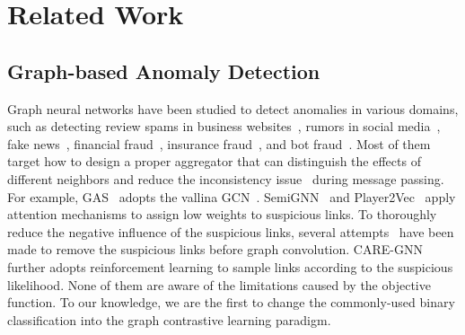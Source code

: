 \section{Related Work}
\label{sec:related}

\subsection{Graph-based Anomaly Detection}
Graph neural networks have been studied to detect anomalies in various domains, such as detecting review spams in business websites~\cite{dou2020enhancing,li2019spam,liu2020alleviating, liu2021pick}, 
rumors in social media~\cite{bian2020rumor,wu2020graph,yang2020rumor}, fake news~\cite{AA-HGNN2020,FangModel}, financial fraud~\cite{liu2019geniepath,xu2021towards,rao2021xfraud}, insurance fraud~\cite{liang2019uncovering}, and bot fraud~\cite{yao2020botspot}.
Most of them target how to design a proper aggregator that can distinguish the effects of different neighbors and reduce the inconsistency issue~\cite{liu2020alleviating} during message passing. For example, GAS~\cite{li2019spam} adopts the vallina GCN~\cite{kipf2016semi}. SemiGNN~\cite{SemiGNN} and Player2Vec~\cite{zhang2019key} apply attention mechanisms to assign low weights to suspicious links. To thoroughly reduce the negative influence of the suspicious links, several attempts~\cite{franceschi2019learning, liu2020alleviating} have been made to remove the suspicious links before graph convolution. CARE-GNN~\cite{dou2020enhancing} further adopts reinforcement learning to sample links according to the suspicious likelihood.
None of them are aware of the limitations caused by the objective function. To our knowledge, we are the first to change the commonly-used binary classification into the graph contrastive learning paradigm. 

